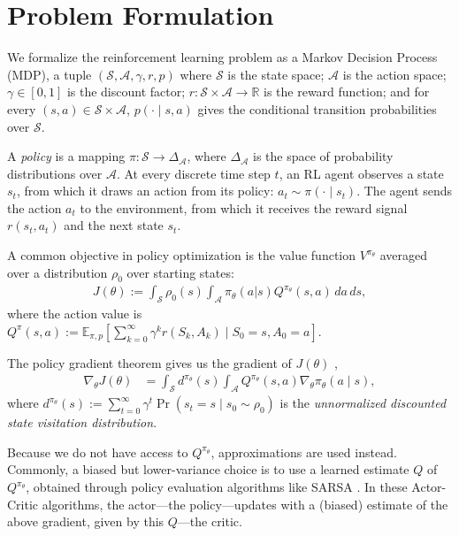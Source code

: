 \documentclass[twoside,11pt]{article}
\newcommand{\Ex}{\mathbb{E}}
\newcommand{\R}{\mathbb{R}}
\newcommand{\statespace}{\mathcal{S}}
\newcommand{\actionspace}{\mathcal{A}}
\newcommand{\Qhat}{{Q}}
\newcommand{\policyparams}{\theta}
\newcommand{\defeq}{:=}
\begin{document}
\section{Problem Formulation}

We formalize the reinforcement learning \citep{sutton2018reinforcement} problem as a {Markov Decision Process} (MDP), a tuple $(\statespace, \actionspace, \gamma, r, p)$ where $\statespace$ is the state space; $\actionspace$ is the action space; $\gamma \in [0,1]$ is the discount factor; $r : \statespace \times \actionspace \to \R$ is the reward function; and for every $(s, a) \in \statespace \times \actionspace$, $p(\cdot \mid s, a)$ gives the conditional transition probabilities over $\statespace$. 

A \textit{policy} is a mapping $\pi : \statespace \to \Delta_\actionspace$, where $\Delta_\actionspace$ is the space of probability distributions over $\actionspace$. 
%
At every discrete time step $t$, an RL agent observes a state $s_t$, from which it draws an action from its policy: $a_t \sim \pi(\cdot \mid s_t)$. The agent sends the action $a_t$ to the environment, from which it receives the reward signal $r(s_t, a_t)$ and the next state $s_t$. 

A common objective in policy optimization is the value function $V^{\pi_\theta}$ averaged over a distribution $\rho_0$ over starting states: 
\begin{align*}
J(\policyparams) \defeq \int_{\statespace} \rho_0(s) \int_{\actionspace} \pi_\policyparams(a | s) Q^{\pi_\policyparams}(s, a) \, da \, ds,
\end{align*}
where the action value is $Q^{\pi}(s,a) \defeq \Ex_{\pi, p}\left[ \sum_{k = 0}^\infty \gamma^k r(S_k, A_k) \mid S_0 = s, A_0 = a \right]$.


The {policy gradient theorem} gives us the gradient of $J(\policyparams)$ \citep{sutton2000policy},
\begin{align}\label{eq:policy-gradient-thm}
    \nabla_\policyparams J(\policyparams) &= \int_{\statespace} d^{\pi_\policyparams}(s) \int_{\actionspace} Q^{\pi_\policyparams}(s, a) \nabla_\policyparams \pi_\policyparams(a \mid s),
\end{align}
%
where $d^{\pi_\policyparams}(s) \defeq \!\sum_{t = 0}^\infty \!\gamma^t \Pr(s_t = s \!\mid\! s_0\! \sim \rho_0\!)$ is the \textit{unnormalized discounted state visitation distribution}. 

Because we do not have access to $Q^{\pi_\policyparams}$, approximations are used instead. 
Commonly, a biased but lower-variance choice is to use a learned estimate $\Qhat$ of $Q^{\pi_\policyparams}$, obtained through policy evaluation algorithms like SARSA \citep{sutton2018reinforcement}. In these Actor-Critic algorithms, the actor---the policy---updates with a (biased) estimate of the above gradient, given by this $\Qhat$---the critic. 
\end{document}
